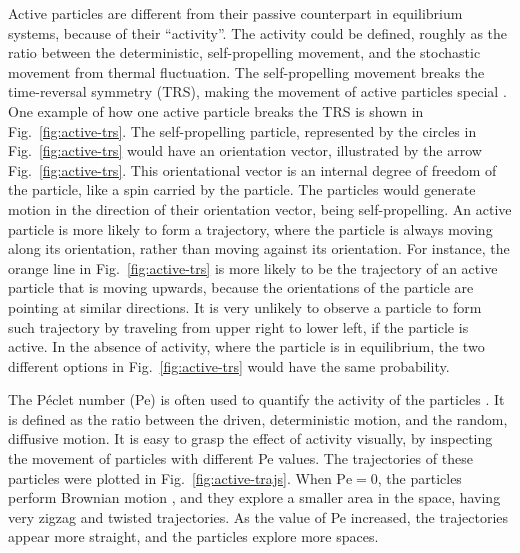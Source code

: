 \documentclass[11pt,twoside]{report}
\begin{document}
Active particles are different from their passive counterpart in equilibrium systems, because of their ``activity''. The activity could be defined, roughly as the ratio between the deterministic, self-propelling movement, and the stochastic movement from thermal fluctuation.
The self-propelling movement breaks the time-reversal symmetry (\gls{TRS}), making the movement of active particles special \cite{obyrne2022}.
One example of how one active particle breaks the TRS is shown in Fig.~\ref{fig:active-trs}. The self-propelling particle, represented by the circles in Fig.~\ref{fig:active-trs} would have an orientation vector, illustrated by the arrow Fig.~\ref{fig:active-trs}.
This orientational vector is an internal degree of freedom of the particle, like a spin carried by the particle.
The particles would generate motion in the direction of their orientation vector, being self-propelling. An active particle is more likely to form a trajectory, where the particle is always moving along its orientation, rather than moving against its orientation.
For instance, the orange line in Fig.~\ref{fig:active-trs} is more likely to be the trajectory of an active particle that is moving upwards, because the orientations of the particle are pointing at similar directions. It is very unlikely to observe a particle to form such trajectory by traveling from upper right to lower left, if the particle is active.
In the absence of activity, where the particle is in equilibrium, the two different options in Fig.~\ref{fig:active-trs} would have the same probability.

The Péclet number (\gls{Pe}) is often used to quantify the activity of the particles \cite{bechinger2016}. It is defined as the ratio between the driven, deterministic motion, and the random, diffusive motion.
It is easy to grasp the effect of activity visually, by inspecting the movement of particles with different Pe values. The trajectories of these particles were plotted in Fig.~\ref{fig:active-trajs}. When $\mathrm{Pe}=0$, the particles perform Brownian motion \cite{rudnick1987}, and they explore a smaller area in the space, having very zigzag and twisted trajectories. As the value of Pe increased, the trajectories appear more straight, and the particles explore more spaces.
\end{document}

